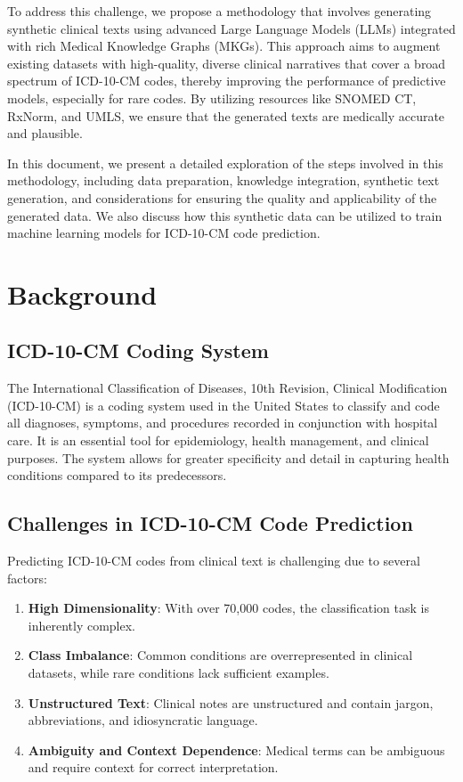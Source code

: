 \documentclass[12pt, a4paper]{article}
\begin{document}
To address this challenge, we propose a methodology that involves generating synthetic clinical texts using advanced Large Language Models (LLMs) integrated with rich Medical Knowledge Graphs (MKGs). This approach aims to augment existing datasets with high-quality, diverse clinical narratives that cover a broad spectrum of ICD-10-CM codes, thereby improving the performance of predictive models, especially for rare codes. By utilizing resources like SNOMED CT, RxNorm, and UMLS, we ensure that the generated texts are medically accurate and plausible.

In this document, we present a detailed exploration of the steps involved in this methodology, including data preparation, knowledge integration, synthetic text generation, and considerations for ensuring the quality and applicability of the generated data. We also discuss how this synthetic data can be utilized to train machine learning models for ICD-10-CM code prediction.

\section{Background}

\subsection{ICD-10-CM Coding System}

The International Classification of Diseases, 10th Revision, Clinical Modification (ICD-10-CM) is a coding system used in the United States to classify and code all diagnoses, symptoms, and procedures recorded in conjunction with hospital care. It is an essential tool for epidemiology, health management, and clinical purposes. The system allows for greater specificity and detail in capturing health conditions compared to its predecessors.

\subsection{Challenges in ICD-10-CM Code Prediction}

Predicting ICD-10-CM codes from clinical text is challenging due to several factors:

\begin{enumerate}
    \item \textbf{High Dimensionality}: With over 70,000 codes, the classification task is inherently complex.
    \item \textbf{Class Imbalance}: Common conditions are overrepresented in clinical datasets, while rare conditions lack sufficient examples.
    \item \textbf{Unstructured Text}: Clinical notes are unstructured and contain jargon, abbreviations, and idiosyncratic language.
    \item \textbf{Ambiguity and Context Dependence}: Medical terms can be ambiguous and require context for correct interpretation.
\end{enumerate}
\end{document}
